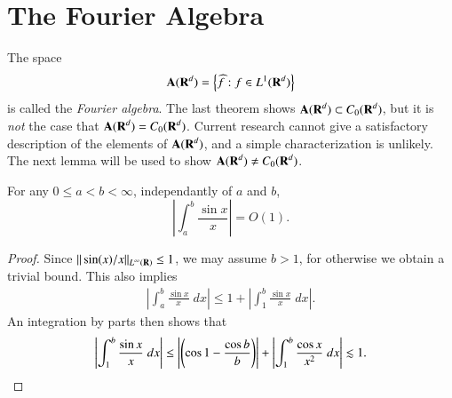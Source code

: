 %

\section{The Fourier Algebra}

The space
%
\[ \mathbf{A}(\operatorname{\mathbf{R}}^d) = \left\{ \widehat{f}: f \in L^1(\operatorname{\mathbf{R}}^d) \right\} \]
%
is called the \emph{Fourier algebra}. The last theorem shows $\mathbf{A}(\operatorname{\mathbf{R}}^d) \subset C_0(\operatorname{\mathbf{R}}^d)$, but it is {\it not} the case that $\mathbf{A}(\operatorname{\mathbf{R}}^d) = C_0(\operatorname{\mathbf{R}}^d)$. Current research cannot give a satisfactory description of the elements of $\mathbf{A}(\operatorname{\mathbf{R}}^d)$, and a simple characterization is unlikely. The next lemma will be used to show $\mathbf{A}(\operatorname{\mathbf{R}}^d) \neq C_0(\operatorname{\mathbf{R}}^d)$.

\begin{lemma}
    For any $0 \leq a < b < \infty$, independantly of $a$ and $b$,
    \[ \left| \int_a^b \frac{\sin x}{x} \right| = O(1). \]
\end{lemma}
\begin{proof}
    Since $\| \sin(x)/x \|_{L^\infty(\operatorname{\mathbf{R}})} \leq 1$, we may assume $b > 1$, for otherwise we obtain a trivial bound. This also implies
    \begin{align*}
        \left| \int_a^b \frac{\sin x}{x}\; dx \right| \leq 1 + \left| \int_1^b \frac{\sin x}{x}\; dx \right|.
    \end{align*}
    An integration by parts then shows that
    \[ \left| \int_1^b \frac{\sin x}{x}\; dx \right| \leq \left| \left( \cos 1 - \frac{\cos b}{b} \right) \right| + \left| \int_1^b \frac{\cos x}{x^2}\; dx \right| \lesssim 1. \qedhere \]
\end{proof}

